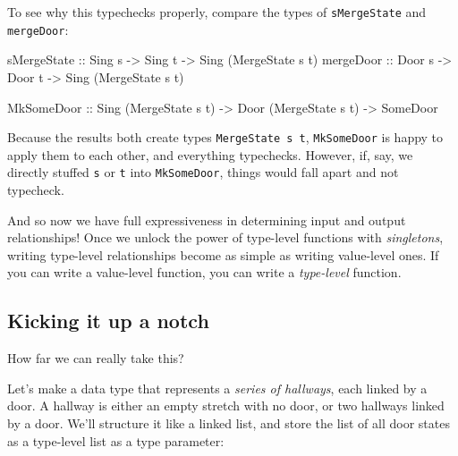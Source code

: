 \documentclass[]{article}
\newenvironment{Shaded}{}{}
\newcommand{\DataTypeTok}[1]{\textcolor[rgb]{0.56,0.13,0.00}{#1}}
\newcommand{\NormalTok}[1]{#1}
\newcommand{\OtherTok}[1]{\textcolor[rgb]{0.00,0.44,0.13}{#1}}
\begin{document}
To see why this typechecks properly, compare the types of \texttt{sMergeState}
and \texttt{mergeDoor}:

\begin{Shaded}
\begin{Highlighting}[]
\OtherTok{sMergeState ::} \DataTypeTok{Sing}\NormalTok{ s }\OtherTok{->} \DataTypeTok{Sing}\NormalTok{ t }\OtherTok{->} \DataTypeTok{Sing}\NormalTok{ (}\DataTypeTok{MergeState}\NormalTok{ s t)}
\OtherTok{mergeDoor   ::} \DataTypeTok{Door}\NormalTok{ s }\OtherTok{->} \DataTypeTok{Door}\NormalTok{ t }\OtherTok{->} \DataTypeTok{Sing}\NormalTok{ (}\DataTypeTok{MergeState}\NormalTok{ s t)}

\DataTypeTok{MkSomeDoor}\OtherTok{  ::} \DataTypeTok{Sing}\NormalTok{ (}\DataTypeTok{MergeState}\NormalTok{ s t) }\OtherTok{->} \DataTypeTok{Door}\NormalTok{ (}\DataTypeTok{MergeState}\NormalTok{ s t) }\OtherTok{->} \DataTypeTok{SomeDoor}
\end{Highlighting}
\end{Shaded}

Because the results both create types \texttt{MergeState\ s\ t},
\texttt{MkSomeDoor} is happy to apply them to each other, and everything
typechecks. However, if, say, we directly stuffed \texttt{s} or \texttt{t} into
\texttt{MkSomeDoor}, things would fall apart and not typecheck.

And so now we have full expressiveness in determining input and output
relationships! Once we unlock the power of type-level functions with
\emph{singletons}, writing type-level relationships become as simple as writing
value-level ones. If you can write a value-level function, you can write a
\emph{type-level} function.

\hypertarget{kicking-it-up-a-notch}{%
\subsection{Kicking it up a notch}\label{kicking-it-up-a-notch}}

How far we can really take this?

Let's make a data type that represents a \emph{series of hallways}, each linked
by a door. A hallway is either an empty stretch with no door, or two hallways
linked by a door. We'll structure it like a linked list, and store the list of
all door states as a type-level list as a type parameter:
\end{document}
